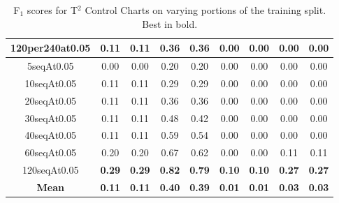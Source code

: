 \documentclass[12pt]{article}
\begin{document}
\begin{table}[]
\begin{tabular}{|c|cc|cc|cc|cc|}
        120per240at0.05 & 0.11                        & 0.11                       & 0.36                        & 0.36                       & 0.00                        & 0.00                       & 0.00                        & 0.00                       \\ \hline
        5seqAt0.05      & 0.00                        & 0.00                       & 0.20                        & 0.20                       & 0.00                        & 0.00                       & 0.00                        & 0.00                       \\ 
        10seqAt0.05     & 0.11                        & 0.11                       & 0.29                        & 0.29                       & 0.00                        & 0.00                       & 0.00                        & 0.00                       \\
        20seqAt0.05     & 0.11                        & 0.11                       & 0.36                        & 0.36                       & 0.00                        & 0.00                       & 0.00                        & 0.00                       \\
        30seqAt0.05     & 0.11                        & 0.11                       & 0.48                        & 0.42                       & 0.00                        & 0.00                       & 0.00                        & 0.00                       \\
        40seqAt0.05     & 0.11                        & 0.11                       & 0.59                        & 0.54                       & 0.00                        & 0.00                       & 0.00                        & 0.00                       \\
        60seqAt0.05     & 0.20                        & 0.20                       & 0.67                        & 0.62                       & 0.00                        & 0.00                       & 0.11                        & 0.11                       \\
        120seqAt0.05    & \textbf{0.29}               & \textbf{0.29}              & \textbf{0.82}               & \textbf{0.79}              & \textbf{0.10}               & \textbf{0.10}              & \textbf{0.27}               & \textbf{0.27}              \\ \hline
        \textbf{Mean}   & \textbf{0.11}               & \textbf{0.11}              & \textbf{0.40}               & \textbf{0.39}              & \textbf{0.01}               & \textbf{0.01}              & \textbf{0.03}               & \textbf{0.03}              \\ \hline
    \end{tabular}
    \caption{F$_1$ scores for T$^2$ Control Charts on varying portions of the training split. Best in bold.}
\end{table}
 
\end{document}
